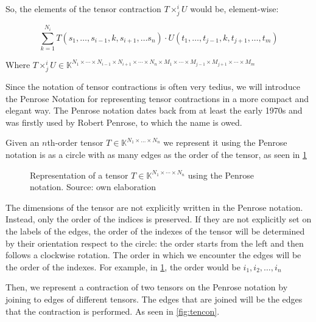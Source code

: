 \documentclass[11pt,a4paper,openright,oneside]{book}
\numberwithin{equation}{section}
\newcommand{\figref}[1]{\cref{#1}}
\begin{document}
So, the elements of the tensor contraction $T \times^i_j U$ would be, element-wise:

$$\sum_{k = 1}^{N_i} T(s_1, \dots, s_{i-1}, k, s_{i+1}, \dots s_n) \cdot U(t_1, \dots, t_{j-1}, k, t_{j+1}, \dots, t_m) $$

Where $T \times^i_j U \in \mathbb{K}^{N_1 \times \cdots \times N_{i-1} \times N_{i+1} \times \cdots \times N_n \times M_1 \times \cdots \times 
M_{j-1} \times M_{j+1} \times \cdots \times M_m}$

Since the notation of tensor contractions is often very tedius, we will introduce the Penrose Notation for representing tensor contractions in a
more compact and elegant way. The Penrose notation dates back from at least the early 1970s and was
firstly used by Robert Penrose, to which the name is owed. \cite{rogerPenroseApplications}

Given an $n$th-order tensor $T \in \mathbb{K}^{N_1 \times \dots \times N_n}$ we represent it using the
Penrose notation is as a circle with as many edges as the order of the tensor, as seen in \figref{fig:tens}

\begin{figure}[h]
\centering
{}
\caption{
    Representation of a tensor $T \in \mathbb{K}^{N_1 \times \cdots \times N_n}$ using the Penrose notation. Source: own elaboration
}
\label{fig:tens}
\end{figure}

The dimensions of the tensor are not explicitly written in the Penrose notation. Instead, only the order
of the indices is preserved. If they are not explicitly set on the labels of the edges,
the order of the indexes of the tensor will be determined by their orientation respect to the circle: 
the order starts from the left and then follows a clockwise rotation. The order in which we encounter the edges will be the order of the indexes. 
For example, in \figref{fig:tens}, the order would be $i_1, i_2, \dots, i_n$

Then, we represent a contraction of two tensors on the Penrose notation by joining to edges of different tensors. The edges that are
joined will be the edges that the contraction is performed. As seen in \figref{fig:tencon}.
\end{document}
